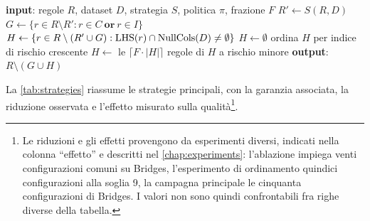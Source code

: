 \begin{algorithm}[htbp]
\caption{Driver di potatura. Le rimozioni garantite sono esenti dal computo del budget: essendo
prive di costo in termini di veto, addebitarle costituirebbe una doppia contabilizzazione.}
\label{alg:driver}
\begin{algorithmic}[1]
\State \textbf{input}: regole $R$, dataset $D$, strategia $S$, politica $\pi$, frazione $F$
\State $R' \gets S(R, D)$ 
\State $G \gets \{ r \in R \setminus R' : r \in C \ \textbf{or}\ r \in I \}$
\State $H \gets \{ r \in R \setminus (R' \cup G) : \mathrm{LHS}(r) \cap \mathrm{NullCols}(D) \neq \emptyset \}$
    \State $H \gets \emptyset$
    \State ordina $H$ per indice di rischio crescente
    \State $H \gets$ le $\lceil F \cdot |H| \rceil$ regole di $H$ a rischio minore
\EndIf
\State \textbf{output}: $R \setminus (G \cup H)$
\end{algorithmic}
\end{algorithm}

La \autoref{tab:strategies} riassume le strategie principali, con la garanzia associata, la
riduzione osservata e l'effetto misurato sulla qualità\footnote{Le riduzioni e gli effetti
provengono da esperimenti diversi, indicati nella colonna ``effetto'' e descritti nel
\autoref{chap:experiments}: l'ablazione impiega venti configurazioni comuni su Bridges,
l'esperimento di ordinamento quindici configurazioni alla soglia 9, la campagna principale le
cinquanta configurazioni di Bridges. I valori non sono quindi confrontabili fra righe diverse
della tabella.}.

